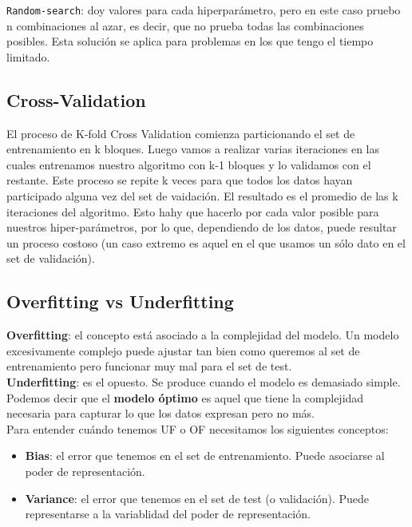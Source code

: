 \documentclass[titlepage,a4paper]{article}
\begin{document}
\texttt{Random-search}: doy valores para cada hiperparámetro, pero en este caso pruebo n combinaciones al azar, es decir, que no prueba todas las combinaciones posibles. Esta solución se aplica para problemas en los que tengo el tiempo limitado.\\

\subsection*{Cross-Validation}
El proceso de K-fold Cross Validation comienza particionando el set de entrenamiento en k bloques. Luego vamos a realizar varias iteraciones en las cuales entrenamos nuestro algoritmo con k-1 bloques y lo validamos con el restante. Este proceso se repite k veces para que todos los datos hayan participado alguna vez del set de vaidación. El resultado es el promedio de las k iteraciones del algoritmo. Esto hahy que hacerlo por cada valor posible para nuestros hiper-parámetros, por lo que, dependiendo de los datos, puede resultar un proceso costoso (un caso extremo es aquel en el que usamos un sólo dato en el set de validación). \\

\subsection*{Overfitting vs Underfitting}
\textbf{Overfitting}: el concepto está asociado a la complejidad del modelo. Un modelo excesivamente complejo puede ajustar tan bien como queremos al set de entrenamiento pero funcionar muy mal para el set de test. \\

\textbf{Underfitting}: es el opuesto. Se produce cuando el modelo es demasiado simple.\\

Podemos decir que el \textbf{modelo óptimo} es aquel que tiene la complejidad necesaria para capturar lo que los datos expresan pero no más. \\

Para entender cuándo tenemos UF o OF necesitamos los siguientes conceptos: 
\begin{itemize}
\item \textbf{Bias}: el error que tenemos en el set de entrenamiento.  Puede asociarse al poder de representación.  
\item \textbf{Variance}: el error que tenemos en el set de test (o validación). Puede representarse a la variablidad del poder de representación. 
\end{itemize}
\end{document}
